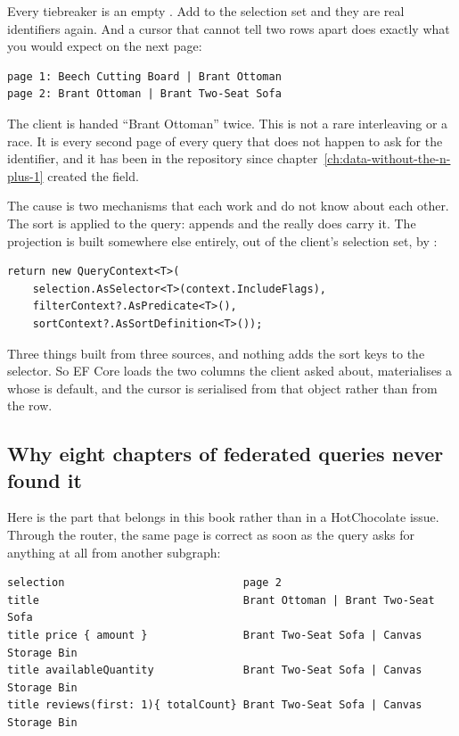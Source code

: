 Every tiebreaker is an empty . Add  to the selection set and
they are real identifiers again. And a cursor that cannot tell two rows apart
does exactly what you would expect on the next page:

\begin{verbatim}
page 1: Beech Cutting Board | Brant Ottoman
page 2: Brant Ottoman | Brant Two-Seat Sofa
\end{verbatim}

The client is handed \enquote{Brant Ottoman} twice. This is not a rare
interleaving or a race. It is every second page of every query that does not
happen to ask for the identifier, and it has been in the repository since
chapter~\ref{ch:data-without-the-n-plus-1} created the field.

%
The cause is two mechanisms that each work and do not know about each other. The
sort is applied to the query:  appends  and the
 really does carry it. The projection is built somewhere else
entirely, out of the client's selection set, by
:

\begin{verbatim}
return new QueryContext<T>(
    selection.AsSelector<T>(context.IncludeFlags),
    filterContext?.AsPredicate<T>(),
    sortContext?.AsSortDefinition<T>());
\end{verbatim}

Three things built from three sources, and nothing adds the sort keys to the
selector. So EF Core loads the two columns the client asked about, materialises
a  whose  is default, and the cursor is serialised from
that object rather than from the row.

\subsection*{Why eight chapters of federated queries never found it}

Here is the part that belongs in this book rather than in a HotChocolate issue.
Through the router, the same page is correct as soon as the query asks for
anything at all from another subgraph:

\begin{verbatim}
selection                            page 2
title                                Brant Ottoman | Brant Two-Seat Sofa
title price { amount }               Brant Two-Seat Sofa | Canvas Storage Bin
title availableQuantity              Brant Two-Seat Sofa | Canvas Storage Bin
title reviews(first: 1){ totalCount} Brant Two-Seat Sofa | Canvas Storage Bin
\end{verbatim}

